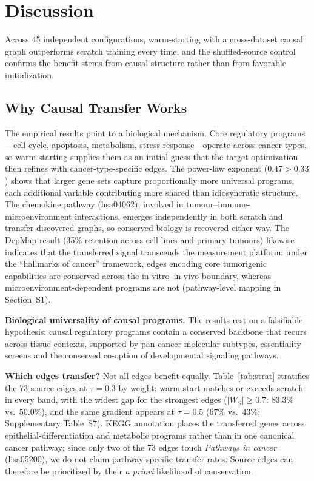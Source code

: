 \documentclass{ws-jbcb}
\begin{document}
\section{Discussion}

Across 45 independent configurations, warm-starting with a cross-dataset causal graph outperforms scratch training every time, and the shuffled-source control confirms the benefit stems from causal structure rather than from favorable initialization.

\subsection{Why Causal Transfer Works}

The empirical results point to a biological mechanism. Core regulatory programs---cell cycle, apoptosis, metabolism, stress response---operate across cancer types, so warm-starting supplies them as an initial guess that the target optimization then refines with cancer-type-specific edges. The power-law exponent ($0.47 > 0.33$) shows that larger gene sets capture proportionally more universal programs, each additional variable contributing more shared than idiosyncratic structure. The chemokine pathway (hsa04062), involved in tumour--immune-microenvironment interactions, emerges independently in both scratch and transfer-discovered graphs, so conserved biology is recovered either way. The DepMap result (35\% retention across cell lines and primary tumours) likewise indicates that the transferred signal transcends the measurement platform: under the ``hallmarks of cancer'' framework,\cite{hanahan2011hallmarks} edges encoding core tumorigenic capabilities are conserved across the in vitro--in vivo boundary, whereas microenvironment-dependent programs are not (pathway-level mapping in Section~S1).

\smallskip\noindent\textbf{Biological universality of causal programs.} The results rest on a falsifiable hypothesis: causal regulatory programs contain a conserved backbone that recurs across tissue contexts, supported by pan-cancer molecular subtypes,\cite{hoadley2018cell} essentiality screens\cite{tsherniak2017} and the conserved co-option of developmental signaling pathways.\cite{zhan2017wnt}

\smallskip\noindent\textbf{Which edges transfer?} Not all edges benefit equally. Table~\ref{tab:strat} stratifies the 73 source edges at $\tau=0.3$ by weight: warm-start matches or exceeds scratch in every band, with the widest gap for the strongest edges ($|W_S|\ge0.7$: $83.3\%$ vs.\ $50.0\%$), and the same gradient appears at $\tau=0.5$ ($67\%$ vs.\ $43\%$; Supplementary Table~S7). KEGG annotation places the transferred genes across epithelial-differentiation and metabolic programs rather than in one canonical cancer pathway; since only two of the 73 edges touch \emph{Pathways in cancer} (hsa05200), we do not claim pathway-specific transfer rates. Source edges can therefore be prioritized by their \textit{a priori} likelihood of conservation.
\end{document}
